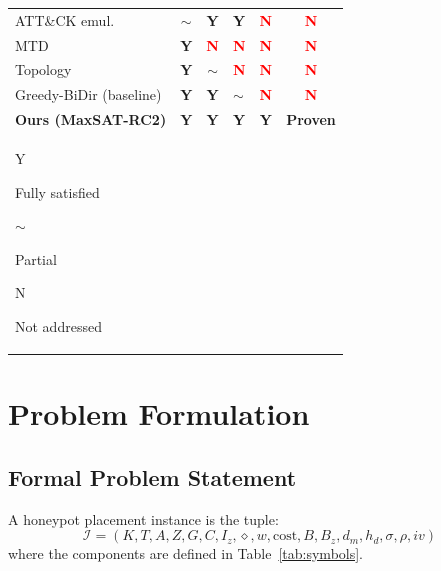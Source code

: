 \documentclass[journal]{IEEEtran}
\begin{document}
\begin{table}[t]
\begin{tabular}{lcc>{\centering\arraybackslash}p{1.0cm}cc}
ATT\&CK emul.~\cite{applebaum2016} &
  \cellcolor{capYellow}$\sim$ &
  \cellcolor{capGreen}\textcolor{green!60!black}{\textbf{Y}} &
  \cellcolor{capGreen}\textcolor{green!60!black}{\textbf{Y}} &
  \cellcolor{capRed}\textcolor{red}{\textbf{N}} &
  \cellcolor{capRed}\textcolor{red}{\textbf{N}} \\
MTD~\cite{zhu2013} &
  \cellcolor{capGreen}\textcolor{green!60!black}{\textbf{Y}} &
  \cellcolor{capRed}\textcolor{red}{\textbf{N}} &
  \cellcolor{capRed}\textcolor{red}{\textbf{N}} &
  \cellcolor{capRed}\textcolor{red}{\textbf{N}} &
  \cellcolor{capRed}\textcolor{red}{\textbf{N}} \\
Topology~\cite{jajodia2005} &
  \cellcolor{capGreen}\textcolor{green!60!black}{\textbf{Y}} &
  \cellcolor{capYellow}$\sim$ &
  \cellcolor{capRed}\textcolor{red}{\textbf{N}} &
  \cellcolor{capRed}\textcolor{red}{\textbf{N}} &
  \cellcolor{capRed}\textcolor{red}{\textbf{N}} \\
Greedy-BiDir (baseline) &
  \cellcolor{capGreen}\textcolor{green!60!black}{\textbf{Y}} &
  \cellcolor{capGreen}\textcolor{green!60!black}{\textbf{Y}} &
  \cellcolor{capYellow}$\sim$ &
  \cellcolor{capRed}\textcolor{red}{\textbf{N}} &
  \cellcolor{capRed}\textcolor{red}{\textbf{N}} \\
\midrule
\rowcolor{capOurs}
\textbf{Ours (MaxSAT-RC2)} &
  \textcolor{green!60!black}{\textbf{Y}} &
  \textcolor{green!60!black}{\textbf{Y}} &
  \textcolor{green!60!black}{\textbf{Y}} &
  \textcolor{green!60!black}{\textbf{Y}} &
  \textbf{Proven} \\
\bottomrule
\multicolumn{6}{l}{\footnotesize
  \colorbox{capGreen}{\strut Y} Fully satisfied \quad
  \colorbox{capYellow}{\strut$\sim$} Partial \quad
  \colorbox{capRed}{\strut N} Not addressed}
\end{tabular}
\end{table}

\section{Problem Formulation}
\label{sec:problem}

\subsection{Formal Problem Statement}

A honeypot placement instance is the tuple:
\begin{equation}
  \mathcal{I} = (K,T,A,Z,G,C,I_z,\diamond,w,\mathrm{cost},B,B_z,
                 d_m,h_d,\sigma,\rho,iv)
  \label{eq:instance}
\end{equation}
where the components are defined in Table~\ref{tab:symbols}.
\end{document}
